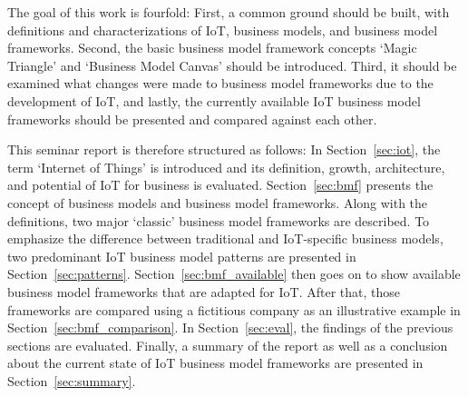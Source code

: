 	The goal of this work is fourfold: First, a common ground should be built, with definitions and characterizations of IoT, business models, and business model frameworks. Second, the basic business model framework concepts `Magic Triangle' and `Business Model Canvas' should be introduced. Third, it should be examined what changes were made to business model frameworks due to the development of IoT, and lastly, the currently available IoT business model frameworks should be presented and compared against each other.
	
	This seminar report is therefore structured as follows: In Section~\ref{sec:iot}, the term `Internet of Things' is introduced and its definition, growth, architecture, and potential of IoT for business is evaluated. Section~\ref{sec:bmf} presents the concept of business models and business model frameworks. Along with the definitions, two major `classic' business model frameworks are described. To emphasize the difference between traditional and IoT-specific business models, two predominant IoT business model patterns are presented in Section~\ref{sec:patterns}. Section~\ref{sec:bmf_available} then goes on to show available business model frameworks that are adapted for IoT. After that, those frameworks are compared using a fictitious company as an illustrative example in Section~\ref{sec:bmf_comparison}. In Section~\ref{sec:eval}, the findings of the previous sections are evaluated. Finally, a summary of the report as well as a conclusion about the current state of IoT business model frameworks are presented in Section~\ref{sec:summary}.
\vspace{-1em}
